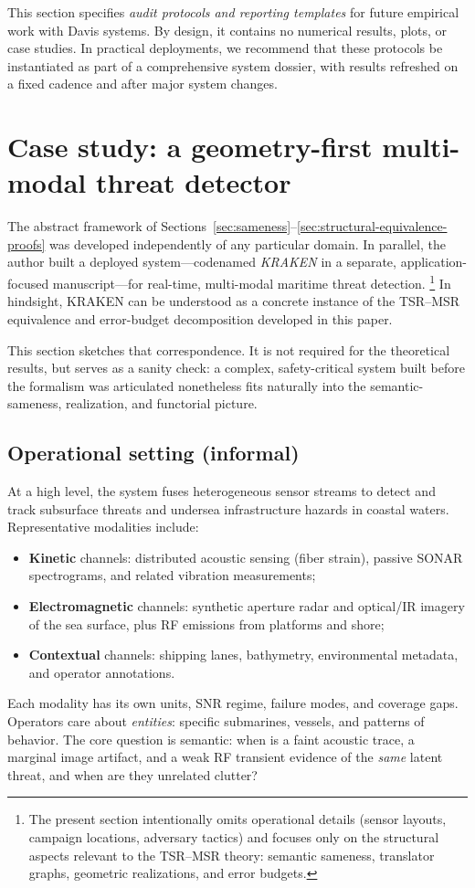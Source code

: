 \documentclass[11pt]{article}
\begin{document}
This section specifies \emph{audit protocols and reporting templates} for
future empirical work with Davis systems. By design, it contains no numerical
results, plots, or case studies. In practical deployments, we recommend that
these protocols be instantiated as part of a comprehensive system dossier,
with results refreshed on a fixed cadence and after major system changes.
\section{Case study: a geometry-first multi-modal threat detector}
\label{sec:kraken-case-study}

The abstract framework of Sections~\ref{sec:sameness}--\ref{sec:structural-equivalence-proofs}
was developed independently of any particular domain. In parallel, the author built
a deployed system---codenamed \emph{KRAKEN} in a separate, application-focused
manuscript---for real-time, multi-modal maritime threat detection.%
\footnote{The present section intentionally omits operational details (sensor
layouts, campaign locations, adversary tactics) and focuses only on the structural
aspects relevant to the TSR--MSR theory: semantic sameness, translator graphs,
geometric realizations, and error budgets.}
In hindsight, KRAKEN can be understood as a concrete instance of the TSR--MSR
equivalence and error-budget decomposition developed in this paper.

This section sketches that correspondence. It is not required for the theoretical
results, but serves as a sanity check: a complex, safety-critical system built
before the formalism was articulated nonetheless fits naturally into the
semantic-sameness, realization, and functorial picture.

\subsection{Operational setting (informal)}

At a high level, the system fuses heterogeneous sensor streams to detect and track
subsurface threats and undersea infrastructure hazards in coastal waters.
Representative modalities include:
\begin{itemize}
  \item \textbf{Kinetic} channels: distributed acoustic sensing (fiber strain),
        passive SONAR spectrograms, and related vibration measurements;
  \item \textbf{Electromagnetic} channels: synthetic aperture radar and optical/IR
        imagery of the sea surface, plus RF emissions from platforms and shore;
  \item \textbf{Contextual} channels: shipping lanes, bathymetry, environmental
        metadata, and operator annotations.
\end{itemize}
Each modality has its own units, SNR regime, failure modes, and coverage gaps.
Operators care about \emph{entities}: specific submarines, vessels, and patterns
of behavior. The core question is semantic: when is a faint acoustic trace,
a marginal image artifact, and a weak RF transient evidence of the \emph{same}
latent threat, and when are they unrelated clutter?
\end{document}
